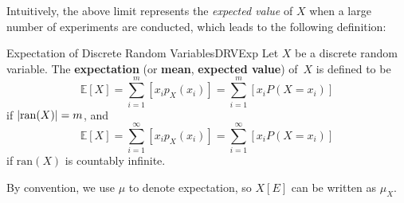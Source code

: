 \documentclass[math]{amznotes}
\theoremstyle{remark}
\newcommand{\0}{\mathbf{0}}
\newcommand{\1}{\mathbf{1}}
\begin{document}
Intuitively, the above limit represents the \textit{expected value} of $X$ when a large number of experiments are conducted, which leads to the following definition:
\begin{dfnbox}{Expectation of Discrete Random Variables}{DRVExp}
    Let $X$ be a discrete random variable. The {\color{red} \textbf{expectation}} (or {\color{red} \textbf{mean}}, {\color{red} \textbf{expected value}}) of~$X$ is defined to be
    \begin{equation*}
        \mathbb{E}[X] = \sum_{i = 1}^{m}\left[x_ip_X(x_i)\right] = \sum_{i = 1}^{m}\left[x_iP(X = x_i)\right]
    \end{equation*}
    if ${\left\lvert {\mathrm{ran}(X)} \right\rvert} = m$, and
    \begin{equation*}
        \mathbb{E}[X] = \sum_{i = 1}^{\infty}\left[x_ip_X(x_i)\right] = \sum_{i = 1}^{\infty}\left[x_iP(X = x_i)\right]
    \end{equation*}
    if $\mathrm{ran}(X)$ is countably infinite.
\end{dfnbox}
By convention, we use $\mu$ to denote expectation, so $X[E]$ can be written as $\mu_X$.
\end{document}
